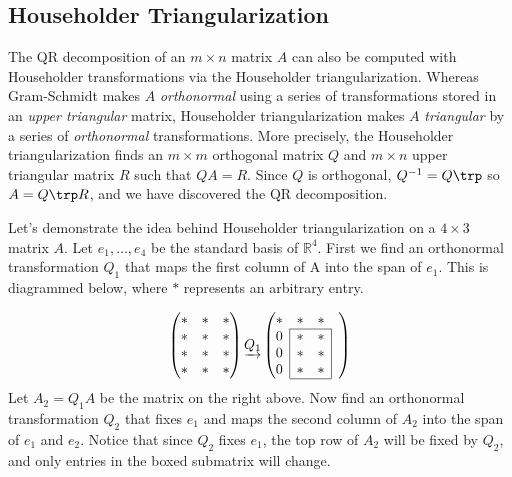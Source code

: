 \subsection*{Householder Triangularization} %

The QR decomposition of an $m \times n$ matrix $A$ can also be computed with Householder transformations via the Householder triangularization.
Whereas Gram-Schmidt makes $A$ \emph{orthonormal} using a series of transformations stored in an \emph{upper triangular} matrix, Householder triangularization makes $A$ \emph{triangular} by a series of \emph{orthonormal} transformations.
More precisely, the Householder triangularization finds an $m \times m$ orthogonal matrix $Q$ and $m \times n$ upper triangular matrix $R$ such that $QA = R$.
Since $Q$ is orthogonal, $Q^{-1}=Q\trp$ so $A = Q\trp R$, and we have discovered the QR decomposition.

Let's demonstrate the idea behind Householder triangularization on a $4 \times 3$ matrix $A$.
Let $e_1, \ldots, e_4$ be the standard basis of $\mathbb{R}^4$.
First we find an orthonormal transformation $Q_1$ that maps the first column of A into the span of $e_1$.
This is diagrammed below, where $*$ represents an arbitrary entry.

\def\mc#1{\multicolumn{1}{c|}{#1}}
\def\lc#1{\multicolumn{1}{|c}{#1}}
\begin{equation*}
\begin{pmatrix}
* & * & * \\
* & * & * \\
* & * & * \\
* & * & *
\end{pmatrix}
\underrightarrow{Q_1}
\begin{pmatrix}

* & * & * & \\ \cline{2-3}
\mc{0} & * & \mc{*}& \\
\mc{0} & * & \mc{*} & \\
\mc{0}& * & \mc{*} & \\ \cline{2-3}
\end{pmatrix}
\end{equation*}
Let $A_2 = Q_1A$ be the matrix on the right above.
Now find an orthonormal transformation $Q_2$ that fixes $e_1$ and maps the second column of $A_2$ into the span of $e_1$ and $e_2$.
Notice that since $Q_2$ fixes $e_1$, the top row of $A_2$ will be fixed by $Q_2$, and only entries in the boxed submatrix will change.

